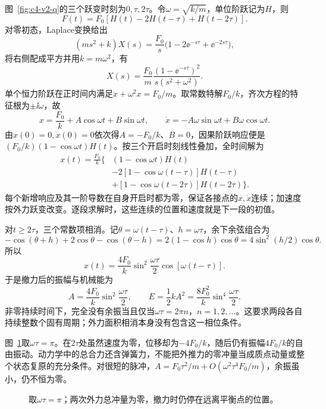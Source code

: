 \begin{solution}
图~\ref{fig:c4-v2-q}的三个跃变时刻为$0,\tau,2\tau$。令$\omega=\sqrt{k/m}$，单位阶跃记为$H$，则
\[F(t)=F_0[H(t)-2H(t-\tau)+H(t-2\tau)].\]
对零初态，Laplace变换给出
\[(ms^2+k)X(s)=\frac{F_0}{s}
\bigl(1-2\ee^{-s\tau}+\ee^{-2s\tau}\bigr),\]
将右侧配成平方并用$k=m\omega^2$，有
\[X(s)=\frac{F_0}{m}\frac{(1-\ee^{-s\tau})^2}{s(s^2+\omega^2)}.
\]
单个恒力阶跃在正时间内满足$\ddot x+\omega^2x=F_0/m$。取常数特解$F_0/k$，齐次方程的特征根为$\pm\ii\omega$，故
\[x=\frac{F_0}{k}+A\cos\omega t+B\sin\omega t,\qquad
\dot x=-A\omega\sin\omega t+B\omega\cos\omega t.\]
由$x(0)=0,\dot x(0)=0$依次得$A=-F_0/k$、$B=0$，因果阶跃响应便是$(F_0/k)(1-\cos\omega t)H(t)$。按三个开启时刻线性叠加，全时间解为
\[\begin{aligned}
x(t)=\frac{F_0}{k}\{&(1-\cos\omega t)H(t)\\
&-2[1-\cos\omega(t-\tau)]H(t-\tau)\\
&+[1-\cos\omega(t-2\tau)]H(t-2\tau)\}.
\end{aligned}\]
每个新增响应及其一阶导数在自身开启时都为零，保证各接点的$x,\dot x$连续；加速度按外力跃变改变。逐段求解时，这些连续的位置和速度就是下一段的初值。

对$t\ge2\tau$，三个常数项相消。记$\theta=\omega(t-\tau)$、$h=\omega\tau$，余下余弦组合为
\[-\cos(\theta+h)+2\cos\theta-\cos(\theta-h)
=2(1-\cos h)\cos\theta=4\sin^2(h/2)\cos\theta.\]
所以
\[\boxed{x(t)=\frac{4F_0}{k}\sin^2\frac{\omega\tau}{2}
\cos[\omega(t-\tau)]}.\]
于是撤力后的振幅与机械能为
\[\boxed{A=\frac{4F_0}{k}\sin^2\frac{\omega\tau}{2}},\qquad
\boxed{E=\frac12kA^2=\frac{8F_0^2}{k}\sin^4\frac{\omega\tau}{2}}.\]
非零持续时间下，完全没有余振当且仅当$\omega\tau=2\pi n$，$n=1,2,\ldots$。这要求两段各自持续整数个固有周期；外力面积相消本身没有包含这一相位条件。

图~\ref{fig:c4-v2-s}取$\omega\tau=\pi$。在$2\tau$处虽然速度为零，位移却为$-4F_0/k$，随后仍有振幅$4F_0/k$的自由振动。动力学中的总合力还含弹簧力，不能把外推力的零冲量当成质点动量或整个状态复原的充分条件。对很短的脉冲，$A=F_0\tau^2/m+O(\omega^2\tau^4F_0/m)$，余振虽小，仍不恒为零。
\begin{figure}[H]\centering
{}
\caption{取$\omega\tau=\pi$；两次外力总冲量为零，撤力时仍停在远离平衡点的位置。}\label{fig:c4-v2-s}
\end{figure}
\end{solution}
